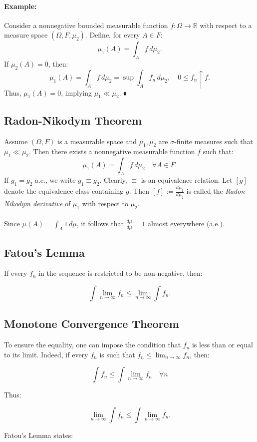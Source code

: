 \documentclass{article}
\newenvironment{example}{\paragraph{Example:}}{\hfill $\blacklozenge $}
\begin{document}
\begin{example}
Consider a nonnegative bounded measurable function $f : \Omega \to \mathbb{R}$ with respect to a measure space $(\Omega, F, \mu_2)$. Define, for every $A \in F$:
\[\mu_1(A) = \int_A f \, d\mu_2.\]
If $\mu_2(A) = 0$, then:
\[\mu_1(A) = \int_A f \, d\mu_2 = \sup \int_A f_n \, d\mu_2, \quad 0 \leq f_n \uparrow f.\]
Thus, $\mu_1(A) = 0$, implying $\mu_1 \ll \mu_2$.
\end{example}

\subsection{Radon-Nikodym Theorem}
Assume $(\Omega, F)$ is a measurable space and $\mu_1, \mu_2$ are $\sigma$-finite measures such that $\mu_1 \ll \mu_2$. Then there exists a nonnegative measurable function $f$ such that:
\[\mu_1(A) = \int_A f \, d\mu_2 \quad \forall A \in F.\]
If $g_1 = g_2$ a.e., we write $g_1 \equiv g_2$. Clearly, $\equiv$ is an equivalence relation. Let $[g]$ denote the equivalence class containing $g$. Then $[f] := \frac{d\mu_1}{d\mu_2}$ is called the \textit{Radon-Nikodym derivative} of $\mu_1$ with respect to $\mu_2$.
\\ \\
Since \(\mu(A) = \int_A 1 \, d\mu\), it follows that \(\frac{d\mu}{d\mu} = 1\) almost everywhere (a.e.).

\subsection{Fatou's Lemma}

If every \( f_n \) in the sequence is restricted to be non-negative, then:

\[\int \lim_{n \to \infty} f_n \leq \lim_{n \to \infty} \int f_n.\]
\subsection{Monotone Convergence Theorem }
To ensure the equality, one can impose the condition that \( f_n \) is less than or equal to its limit. Indeed, if every \( f_n \) is such that \( f_n \leq \lim_{n \to \infty} f_n \), then:

\[\int f_n \leq \int \lim_{n \to \infty} f_n \quad \forall n\]

Thus:

\[\lim_{n \to \infty} \int f_n \leq \int \lim_{n \to \infty} f_n.\]

Fatou's Lemma states:
\end{document}
